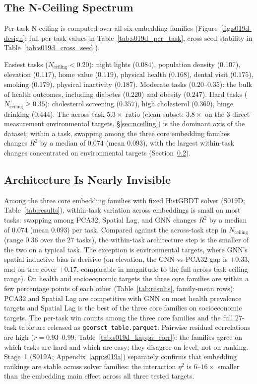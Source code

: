\documentclass{article}
\begin{document}
\subsection{The N-Ceiling Spectrum}

Per-task N-ceiling is computed over all six embedding families (Figure~\ref{fig:s019d-design}; full per-task values in Table~\ref{tab:s019d_per_task}, cross-seed stability in Table~\ref{tab:s019d_cross_seed}).

Easiest tasks ($N_{\text{ceiling}} {<} 0.20$): night lights ($0.084$), population density ($0.107$), elevation ($0.117$), home value ($0.119$), physical health ($0.168$), dental visit ($0.175$), smoking ($0.179$), physical inactivity ($0.187$). Moderate tasks ($0.20\text{--}0.35$): the bulk of health outcomes, including diabetes ($0.220$) and obesity ($0.247$). Hard tasks ($N_{\text{ceiling}} {\geq} 0.35$): cholesterol screening ($0.357$), high cholesterol ($0.369$), binge drinking ($0.444$). The across-task $5.3{\times}$ ratio (clean subset: $3.8{\times}$ on the 3 direct-measurement environmental targets, \S\ref{sec:nceiling}) is the dominant axis of the dataset; within a task, swapping among the three core embedding families changes $R^2$ by a median of $0.074$ (mean $0.093$), with the largest within-task changes concentrated on environmental targets (Section~\ref{sec:arch_invisible}).

\subsection{Architecture Is Nearly Invisible}
\label{sec:arch_invisible}

Among the three core embedding families with fixed HistGBDT solver (S019D; Table~\ref{tab:results}), within-task variation across embeddings is small on most tasks: swapping among PCA32, Spatial Lag, and GNN changes $R^2$ by a median of $0.074$ (mean $0.093$) per task. Compared against the across-task step in $N_{\text{ceiling}}$ (range $0.36$ over the 27 tasks), the within-task architecture step is the smaller of the two on a typical task. The exception is environmental targets, where GNN's spatial inductive bias is decisive (on elevation, the GNN-vs-PCA32 gap is $+0.33$, and on tree cover $+0.17$, comparable in magnitude to the full across-task ceiling range). On health and socioeconomic targets the three core families are within a few percentage points of each other (Table~\ref{tab:results}, family-mean rows): PCA32 and Spatial Lag are competitive with GNN on most health prevalence targets and Spatial Lag is the best of the three core families on socioeconomic targets. The per-task win counts among the three core families and the full $27$-task table are released as \texttt{georsct\_table.parquet}. Pairwise residual correlations are high ($r = 0.93$--$0.99$; Table~\ref{tab:s019d_kappa_corr}): the families agree on which tasks are hard and which are easy; they disagree on level, not on ranking. Stage~1 (S019A; Appendix~\ref{app:s019a}) separately confirms that embedding rankings are stable across solver families: the interaction $\eta^2$ is $6$--$16{\times}$ smaller than the embedding main effect across all three tested targets.
\end{document}
